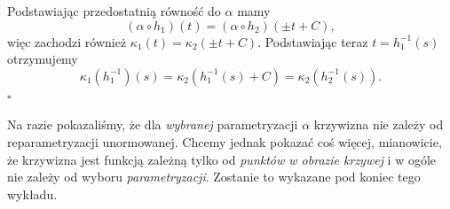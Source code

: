 \begin{frame}[<+->]


Podstawiając przedostatnią równość do $\alpha$ mamy 
\[(\alpha\circ h_1)(t)=(\alpha\circ h_2)(\pm t+C),\]
\pause więc zachodzi również $\kappa_1(t)=\kappa_2(\pm t+C)$. \pause Podstawiając teraz $t=h_1^{-1}(s)$ otrzymujemy 
\[\kappa_1(h_1^{-1})(s)=\kappa_2(h_1^{-1}(s)+C)=\kappa_2(h_2^{-1}(s)\!).\]
\hfill $\square$

\end{frame}

\begin{uwaga}
Na razie pokazaliśmy, że dla \textit{wybranej} parametryzacji $\alpha$ krzywizna nie zależy od reparametryzacji unormowanej.
\medskip
Chcemy jednak pokazać coś więcej, mianowicie, że krzywizna jest funkcją zależną tylko od \textit{punktów w obrazie krzywej} i w ogóle nie zależy od wyboru \textit{parametryzacji}. Zostanie to wykazane pod koniec tego wykładu.
\end{uwaga}


